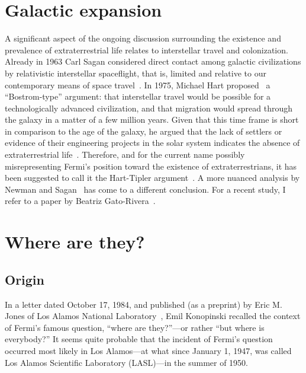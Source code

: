 \section{Galactic expansion}
\label{2023-UFO-part-Speculation-among-hypercivilization-zoo-hypothesis-ex}

A significant aspect of the ongoing discussion surrounding the existence and prevalence of extraterrestrial life relates to interstellar travel
and colonization.
Already in 1963 Carl Sagan considered direct contact among galactic civilizations
by relativistic interstellar spaceflight, that is, limited and relative to our contemporary means of space travel~\cite{Sagan_1963}.
In 1975, Michael Hart proposed~\cite{1975QJRAS..16..128H,hart_1995} a ``Bostrom-type'' argument:
that interstellar travel would be possible for a technologically advanced civilization,
and that migration would spread through the galaxy in a matter of a few million years.
Given that this time frame is short in comparison to the age of the galaxy, he argued that the
lack of settlers or evidence of their engineering projects in the solar system indicates the absence of extraterrestrial life~\cite{Jones-1985}.
Therefore, and for the current name possibly misrepresenting Fermi's position toward the existence of extraterrestrians,
it has been suggested to call it the Hart-Tipler argument~\cite{Gray-2015}.
A more nuanced analysis by Newman and Sagan~\cite{Newman_1981} has come to a different conclusion.
For a recent study, I refer to a paper by Beatriz Gato-Rivera~\cite{Gato-Rivera2005Dec}.


\section{Where are they?}
\label{2023-UFO-part-Speculation-among-hypercivilization-zoo-hypothesis-fp}


\subsection{Origin}

In a letter dated October 17, 1984, and published (as a preprint) by Eric M. Jones of Los Alamos National Laboratory~\cite{Jones-1985}, Emil Konopinski recalled the context of Fermi's famous question, ``where are they?''---or rather ``but where is everybody?'' It seems quite probable that the incident of Fermi's question occurred most likely in Los Alamos---at what since January 1, 1947, was called Los Alamos Scientific Laboratory (LASL)---in the summer of 1950.

